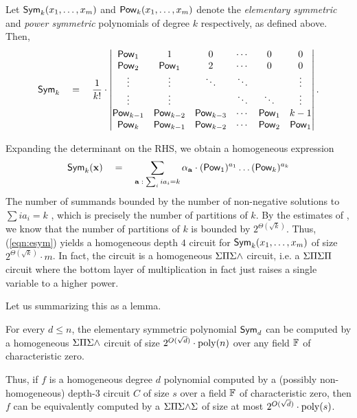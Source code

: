 \begin{lemma}\label{lem:newton-identities}
  Let $\operatorname{\mathsf{Sym}}_k(x_1,\ldots,x_m)$ and $\operatorname{\mathsf{Pow}}_k(x_1,\ldots,x_m)$ denote
  the \emph{elementary symmetric} and \emph{power symmetric} polynomials of degree
  $k$ respectively, as defined above. 
Then,
  $$
  \operatorname{\mathsf{Sym}}_k\quad = \quad\frac{1}{k!} \cdot 
  \begin{vmatrix}\operatorname{\mathsf{Pow}}_1 & 1 & 0 & \cdots & 0 & 0\\ 
    \operatorname{\mathsf{Pow}}_2 & \operatorname{\mathsf{Pow}}_1 & 2 & \cdots & 0 & 0 \\ 
    \vdots& \vdots & \ddots & \ddots &  & \vdots \\
    \vdots& \vdots &  & \ddots & \ddots & \vdots \\
    \operatorname{\mathsf{Pow}}_{k-1} & \operatorname{\mathsf{Pow}}_{k-2} & \operatorname{\mathsf{Pow}}_{k-3}& \cdots & \operatorname{\mathsf{Pow}}_1 & k-1 \\ 
    \operatorname{\mathsf{Pow}}_k & \operatorname{\mathsf{Pow}}_{k-1} & \operatorname{\mathsf{Pow}}_{k-2} & \cdots & \operatorname{\mathsf{Pow}}_2 & \operatorname{\mathsf{Pow}}_1 
  \end{vmatrix}.
  $$
\end{lemma}

Expanding the determinant on the RHS, we obtain a homogeneous
expression
\begin{equation}\label{eqn:esym}
\operatorname{\mathsf{Sym}}_k(\mathbf{x}) \quad = \quad \sum_{\mathbf{a}\;:\; \sum_i ia_i = k} \alpha_{\mathbf{a}} \cdot (\operatorname{\mathsf{Pow}}_1)^{a_1}\dots (\operatorname{\mathsf{Pow}}_k)^{a_k}
\end{equation}
The number of summands bounded by the number of non-negative solutions
to $\sum i a_i = k$ , which is precisely the number of partitions of
$k$.
By the estimates of \cite{hr18}, we know that the number of partitions
of $k$ is bounded by $2^{\Theta(\sqrt{k})}$.
Thus, (\ref{eqn:esym}) yields a homogeneous depth $4$ circuit for
$\operatorname{\mathsf{Sym}}_k(x_1,\dots, x_m)$ of size $2^{\Theta(\sqrt{k})} \cdot m$.
In fact, the circuit is a homogeneous $\Sigma\Pi\Sigma\mathord{\wedge}$ circuit, i.e. a $\Sigma\Pi\Sigma\Pi$
circuit where the bottom layer of multiplication in fact just raises a
single variable to a higher power. 

Let us summarizing this as a lemma. 

\begin{lemma}[\cite{sw2001}]\label{lem:d3-d5} For every $d \leq n$, the elementary
  symmetric polynomial $\operatorname{\mathsf{Sym}}_d$ can be computed by a homogeneous $\Sigma\Pi\Sigma\mathord{\wedge}$ circuit of size $2^{O(\sqrt{d})} \cdot \operatorname{poly}(n)$ over any field $\mathbb{F}$ of characteristic zero.

  Thus, if $f$ is a homogeneous degree $d$ polynomial computed by a (possibly non-homogeneous) depth-$3$ circuit $C$ of size $s$ over a field $\mathbb{F}$ of characteristic zero, then $f$ can be equivalently computed by a $\Sigma\Pi\Sigma\mathord{\wedge}\Sigma$ of size at most $2^{O(\sqrt{d})} \cdot \operatorname{poly}(s)$.
\end{lemma}

